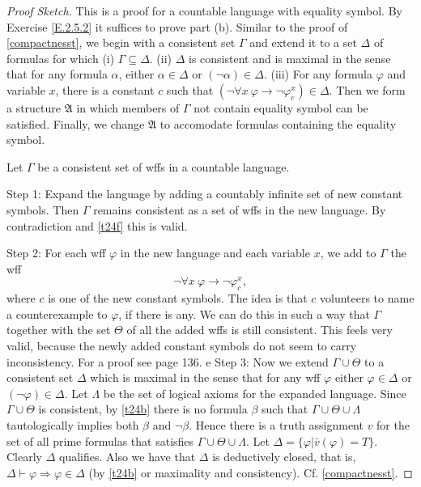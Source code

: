 \begin{proof}[Proof Sketch]
  This is a proof for a countable language with equality symbol. By Exercise \ref{E.2.5.2} it suffices to prove part (b). Similar to the proof of \ref{compactnesst}, we begin with a consistent set $\Gamma$ and extend it to a set $\Delta$ of formulas for which (i) $\Gamma\subseteq \Delta$. (ii) $\Delta$ is consistent and is maximal in the sense that for any formula $\alpha$, either $\alpha\in \Delta$ or $(\neg \alpha)\in \Delta$. (iii) For any formula $\varphi$ and variable $x$, there is a constant $c$ such that $(\neg\forall x\ \varphi\rightarrow\neg \varphi_c^x)\in \Delta.$ Then we form a structure $\mathfrak{A}$ in which members of $\Gamma$ not contain equality symbol can be satisfied. Finally, we change $\mathfrak{A}$ to accomodate formulas containing the equality symbol.

  Let $\Gamma$ be a consistent set of wffs in a countable language.

  Step 1: Expand the language by adding a countably infinite set of new constant symbols. Then $\Gamma$ remains consistent as a set of wffs in the new language. By contradiction and \ref{t24f} this is valid.

  Step 2: For each wff $\varphi$ in the new language and each variable $x$, we add to $\Gamma$ the wff
  \[
    \neg\forall x\ \varphi\rightarrow\neg \varphi_c^x,
  \]
  where $c$ is one of the new constant symbols. The idea is that $c$ volunteers to name a counterexample to $\varphi$, if there is any. We can do this in such a way that $\Gamma$ together with the set $\Theta$ of all the added wffs is still consistent. This feels very valid, because the newly added constant symbols do not seem to carry inconsistency. For a proof see page 136.
  e
  Step 3: Now we extend $\Gamma\cup\Theta$ to a consistent set $\Delta$ which is maximal in the sense that for any wff $\varphi$ either $\varphi\in \Delta$ or $(\neg \varphi)\in \Delta$. Let $\Lambda$ be the set of logical axioms for the expanded language. Since $\Gamma\cup\Theta$ is consistent, by \ref{t24b} there is no formula $\beta$ such that $\Gamma\cup\Theta\cup \Lambda$ tautologically implies both $\beta$ and $\neg \beta$. Hence there is a truth assignment $v$ for the set of all prime formulas that satisfies $\Gamma\cup\Theta\cup \Lambda$. Let $\Delta=\{\varphi|\bar{v}(\varphi)=T\}.$ Clearly $\Delta$ qualifies. Also we have that $\Delta$ is deductively closed, that is, $\Delta\vdash \varphi\Rightarrow \varphi\in \Delta$ (by \ref{t24b} or maximality and consistency). Cf. \ref{compactnesst}.


\end{proof}
